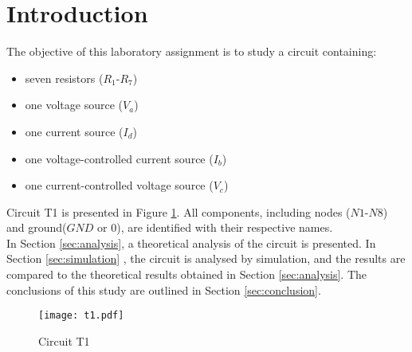 \section{Introduction}
\label{sec:introduction}


The objective of this laboratory assignment is to study a circuit containing:
\begin{itemize}
	\item seven resistors ($R_1$-$R_7$)
	\item one voltage source ($V_a$)
	\item one current source ($I_d$)
	\item one voltage-controlled current source ($I_b$)
	\item one current-controlled voltage source ($V_c$)
\end{itemize}

Circuit T1 is presented in Figure \ref{fig:Desenho_t1}. All components, including nodes
($N1$-$N8$) and ground($GND$ or $0$), are identified with their respective names. \\

In Section \ref{sec:analysis}, a theoretical analysis of the circuit is
presented. In Section \ref{sec:simulation} , the circuit is analysed by
simulation, and the results are compared to the theoretical results
obtained in Section \ref{sec:analysis}. The conclusions of this study
are outlined in Section \ref{sec:conclusion}.



\begin{figure}[h]
	\centering
	\texttt{[image: t1.pdf]}
	\caption{Circuit T1}
\label{fig:Desenho_t1}
\end{figure}

